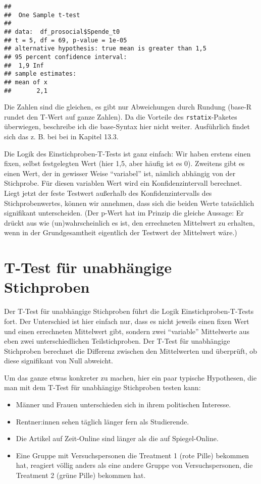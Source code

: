 \documentclass[
]{book}
\begin{document}
\begin{verbatim}
## 
##  One Sample t-test
## 
## data:  df_prosocial$Spende_t0
## t = 5, df = 69, p-value = 1e-05
## alternative hypothesis: true mean is greater than 1,5
## 95 percent confidence interval:
##  1,9 Inf
## sample estimates:
## mean of x 
##       2,1
\end{verbatim}

Die Zahlen sind die gleichen, es gibt nur Abweichungen durch Rundung (base-R rundet den T-Wert auf ganze Zahlen). Da die Vorteile des \texttt{rstatix}-Paketes überwiegen, beschreibe ich die base-Syntax hier nicht weiter. Ausführlich findet sich das z. B. bei bei \citet{Phillips_2018} in Kapitel 13.3.

Die Logik des Einstichproben-T-Tests ist ganz einfach: Wir haben erstens einen fixen, selbst festgelegten Wert (hier 1,5, aber häufig ist es 0). Zweitens gibt es einen Wert, der in gewisser Weise ``variabel'' ist, nämlich abhängig von der Stichprobe. Für diesen variablen Wert wird ein Konfidenzintervall berechnet. Liegt jetzt der feste Testwert außerhalb des Konfidenzintervalls des Stichprobenwertes, können wir annehmen, dass sich die beiden Werte tatsächlich signifikant unterscheiden. (Der p-Wert hat im Prinzip die gleiche Aussage: Er drückt aus wie (un)wahrscheinlich es ist, den errechneten Mittelwert zu erhalten, wenn in der Grundgesamtheit eigentlich der Testwert der Mittelwert wäre.)

\hypertarget{t-test-fuxfcr-unabhuxe4ngige-stichproben}{%
\section{T-Test für unabhängige Stichproben}\label{t-test-fuxfcr-unabhuxe4ngige-stichproben}}

Der T-Test für unabhängige Stichproben führt die Logik Einstichproben-T-Tests fort. Der Unterschied ist hier einfach nur, dass es nicht jeweils einen fixen Wert und einen errechneten Mittelwert gibt, sondern zwei ``variable'' Mittelwerte aus eben zwei unterschiedlichen Teilstichproben. Der T-Test für unabhängige Stichproben berechnet die Differenz zwischen den Mittelwerten und überprüft, ob diese signifikant von Null abweicht.

Um das ganze etwas konkreter zu machen, hier ein paar typische Hypothesen, die man mit dem T-Test für unabhängige Stichproben testen kann:

\begin{itemize}
\item
  Männer und Frauen unterschieden sich in ihrem politischen Interesse.
\item
  Rentner:innen sehen täglich länger fern als Studierende.
\item
  Die Artikel auf Zeit-Online sind länger als die auf Spiegel-Online.
\item
  Eine Gruppe mit Versuchspersonen die Treatment 1 (rote Pille) bekommen hat, reagiert völlig anders als eine andere Gruppe von Versuchspersonen, die Treatment 2 (grüne Pille) bekommen hat.
\end{itemize}
\end{document}
